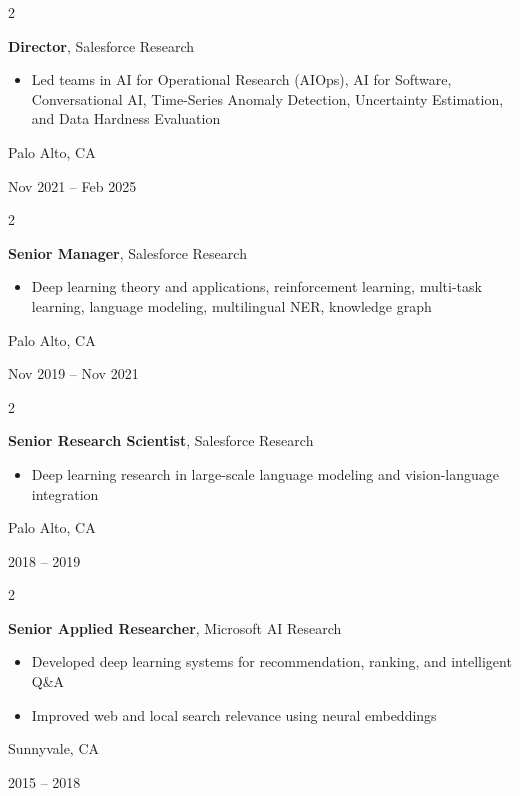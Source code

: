\documentclass[10pt, letterpaper]{article}
\newenvironment{highlights}{
    \begin{itemize}[
        topsep=0.10 cm,
        parsep=0.10 cm,
        partopsep=0pt,
        itemsep=0pt,
        leftmargin=0.4 cm + 10pt
    ]
}{
    \end{itemize}
}
\newenvironment{twocolentry}[2][]{
    \onecolentry
    \def\secondColumn{#2}
    \setcolumnwidth{\fill, 4.5 cm}
    \begin{paracol}{2}
}{
    \switchcolumn \raggedleft \secondColumn
    \end{paracol}
    \endonecolentry
}
\begin{document}
    \vspace{0.12 cm}

    \begin{twocolentry}{
        Palo Alto, CA

        Nov 2021 -- Feb 2025
    }
        \textbf{\color{primaryColor}Director}, Salesforce Research
        \begin{highlights}
            \item Led teams in AI for Operational Research (AIOps), AI for Software, Conversational AI, Time-Series Anomaly Detection, Uncertainty Estimation, and Data Hardness Evaluation
        \end{highlights}
    \end{twocolentry}

    \vspace{0.12 cm}

    \begin{twocolentry}{
        Palo Alto, CA

        Nov 2019 -- Nov 2021
    }
        \textbf{\color{primaryColor}Senior Manager}, Salesforce Research
        \begin{highlights}
            \item Deep learning theory and applications, reinforcement learning, multi-task learning, language modeling, multilingual NER, knowledge graph
        \end{highlights}
    \end{twocolentry}

    \vspace{0.12 cm}

    \begin{twocolentry}{
        Palo Alto, CA

        2018 -- 2019
    }
        \textbf{\color{primaryColor}Senior Research Scientist}, Salesforce Research
        \begin{highlights}
            \item Deep learning research in large-scale language modeling and vision-language integration
        \end{highlights}
    \end{twocolentry}

    \vspace{0.12 cm}

    \begin{twocolentry}{
        Sunnyvale, CA

        2015 -- 2018
    }
        \textbf{\color{primaryColor}Senior Applied Researcher}, Microsoft AI Research
        \begin{highlights}
            \item Developed deep learning systems for recommendation, ranking, and intelligent Q\&A
            \item Improved web and local search relevance using neural embeddings
        \end{highlights}
    \end{twocolentry}
\end{document}
